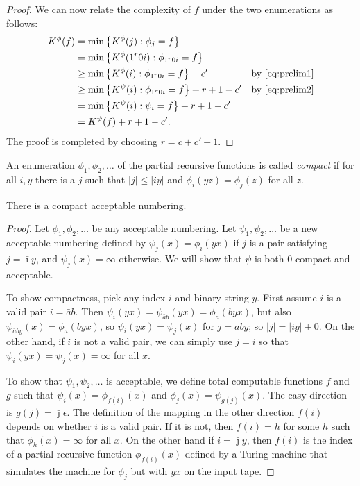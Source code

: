 \documentclass{style/llncs}
\begin{document}
{\begin{proof}
We can now relate the complexity of $f$ under the two enumerations as follows:
\begin{align*}
K^\phi(f) &= \min\left\{ K^\phi(j) : \phi_j = f \right\}& \\
       &= \min\left\{ K^\phi(1^r0i) : \phi_{1^r0i} = f \right\}& \\
       &\ge  \min\left\{ K^\phi(i) : \phi_{1^r0i} = f \right\}-c'&\text{by~\eqref{eq:prelim1}}\\
       &\geq \min\left\{ K^\psi(i)  : \phi_{1^r0i} = f \right\}+r+1-c'& \text{by \eqref{eq:prelim2}}\\
       &= \min\left\{ K^\psi(i) : \psi_{i} = f \right\} + r+1 -c'& \\
       &= K^\psi(f) + r + 1 - c'.
\end{align*}
The proof is completed by choosing $r=c+c'-1$.
\end{proof}

\begin{definition}
  An enumeration $\phi_1,\phi_2,\ldots$ of the partial recursive
  functions is called \emph{compact} if for all $i,y$ there is a $j$
  such that $|j|\le|i y|$ and $\phi_i(y z)=\phi_j(z)$ for all $z$.
\end{definition}

\begin{lemma}
There is a compact acceptable numbering.
\end{lemma}
\begin{proof}
  Let $\phi_1,\phi_2,\ldots$ be any acceptable numbering. Let $\psi_1,\psi_2,\ldots$ be a new acceptable numbering defined by $\psi_j(x)=\phi_i(y x)$ if $j$ is a pair satisfying $j=\bar\imath y$, and $\psi_j(x)=\infty$ otherwise.  We will show that $\psi$ is both $0$-compact and acceptable. 

To show compactness, pick any index $i$ and binary string $y$. First assume $i$ is a valid pair $i=\bar a b$. Then  $\psi_i(y x) = \psi_{\bar a b}(y x)=\phi_a(b y x)$, but also $\psi_{\bar a b y}(x)=\phi_a(b y x)$, so $\psi_i(y x) = \psi_j(x)$ for $j=\bar a b y$; so $|j|=|iy|+0$. On the other hand, if $i$ is not a valid pair, we can simply use $j=i$ so that $\psi_i(y x)=\psi_j(x)=\infty$ for all $x$.

To show that $\psi_1,\psi_2,\ldots$ is acceptable, we define total
computable functions $f$ and $g$ such that $\psi_i(x)=\phi_{f(i)}(x)$
and $\phi_j(x)=\psi_{g(j)}(x)$. The easy direction is
$g(j)=\bar\jmath\epsilon$. The definition of the mapping in the other
direction $f(i)$ depends on whether $i$ is a valid pair. If it is not,
then $f(i)=h$ for some $h$ such that $\phi_h(x)=\infty$ for all $x$. On the other hand if $i=\bar\jmath y$, then $f(i)$ is the index of a partial recursive function $\phi_{f(i)}(x)$ defined by a Turing machine that simulates the machine for $\phi_j$ but with $yx$ on the input tape.
\end{proof}


}
\end{document}
